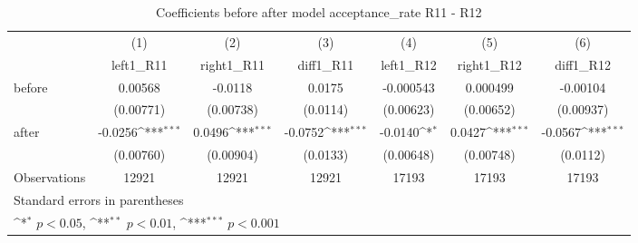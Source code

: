 \begin{table}[htbp]\centering
\def\sym#1{\ifmmode^{#1}\else\(^{#1}\)\fi}
\caption{Coefficients before after model acceptance\_rate R11 - R12}
\begin{tabular}{l*{6}{c}}
\hline\hline
                    &\multicolumn{1}{c}{(1)}&\multicolumn{1}{c}{(2)}&\multicolumn{1}{c}{(3)}&\multicolumn{1}{c}{(4)}&\multicolumn{1}{c}{(5)}&\multicolumn{1}{c}{(6)}\\
                    &\multicolumn{1}{c}{left1\_R11}&\multicolumn{1}{c}{right1\_R11}&\multicolumn{1}{c}{diff1\_R11}&\multicolumn{1}{c}{left1\_R12}&\multicolumn{1}{c}{right1\_R12}&\multicolumn{1}{c}{diff1\_R12}\\
\hline
before              &     0.00568         &     -0.0118         &      0.0175         &   -0.000543         &    0.000499         &    -0.00104         \\
                    &   (0.00771)         &   (0.00738)         &    (0.0114)         &   (0.00623)         &   (0.00652)         &   (0.00937)         \\
[1em]
after               &     -0.0256\sym{***}&      0.0496\sym{***}&     -0.0752\sym{***}&     -0.0140\sym{*}  &      0.0427\sym{***}&     -0.0567\sym{***}\\
                    &   (0.00760)         &   (0.00904)         &    (0.0133)         &   (0.00648)         &   (0.00748)         &    (0.0112)         \\
\hline
Observations        &       12921         &       12921         &       12921         &       17193         &       17193         &       17193         \\
\hline\hline
\multicolumn{7}{l}{\footnotesize Standard errors in parentheses}\\
\multicolumn{7}{l}{\footnotesize \sym{*} \(p<0.05\), \sym{**} \(p<0.01\), \sym{***} \(p<0.001\)}\\
\end{tabular}
\end{table}
